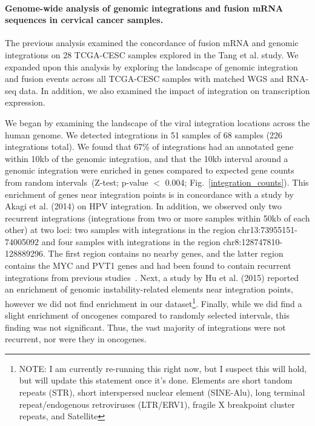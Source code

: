 \documentclass[10pt]{article}
\begin{document}
\paragraph{\textbf{Genome-wide analysis of genomic integrations and fusion mRNA sequences in cervical cancer samples.}}
The previous analysis examined the concordance of fusion mRNA and genomic integrations on 28 TCGA-CESC samples explored in the Tang et al. study.  We expanded upon this analysis by exploring the landscape of genomic integration and fusion events across all TCGA-CESC samples with matched WGS and RNA-seq data.  In addition, we also examined the impact of integration on transcription expression.  

We began by examining the landscape of the viral integration locations across the human genome.  We detected integrations in 51 samples of 68 samples (226 integrations total).  We found that 67\% of integrations had an annotated gene within 10kb of the genomic integration, and that the 10kb interval around a genomic integration were enriched in genes compared to expected gene counts from random intervals~(Z-test; p-value $<$ 0.004; Fig.~\ref{integration_counts}).  This enrichment of genes near integration points is in concordance with a study by Akagi et al. (2014) on HPV integration.  In addition, we observed only two recurrent integrations (integrations from two or more samples within 50kb of each other) at two loci:  two samples with integrations in the region chr13:73955151-74005092 and four samples with integrations in the region chr8:128747810-128889296.  The first region contains no nearby genes, and the latter region contains the MYC and PVT1 genes and had been found to contain recurrent integrations from previous studies~\cite{Hu2015}.  Next, a study by Hu et al. (2015) reported an enrichment of genomic instability-related elements near integration points, however we did not find enrichment in our dataset\footnote{NOTE:  I am currently re-running this right now, but I suspect this will hold, but will update this statement once it's done.  Elements are short tandom repeats (STR), short interspersed nuclear element (SINE-Alu), long terminal repeat/endogenous retroviruses (LTR/ERV1), fragile X breakpoint cluster repeats, and Satellite}.  Finally, while we did find a slight enrichment of oncogenes compared to randomly selected intervals, this finding was not significant.  Thus, the vast majority of integrations were not recurrent, nor were they in oncogenes.  
\end{document}
